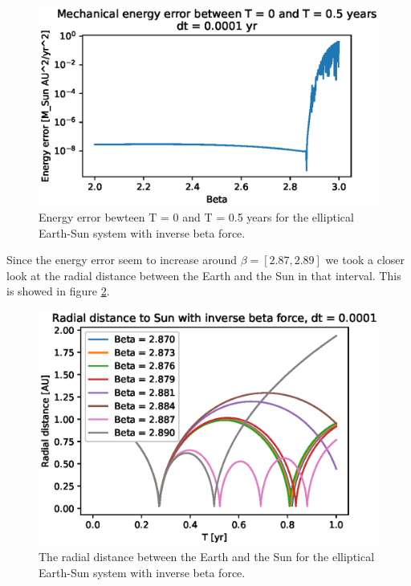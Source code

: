 \documentclass[american,a4paper,12pt]{article}
\begin{document}
\begin{figure}[H]
    \centering
    \includegraphics[width = \textwidth]{figures/EarthSun_InverseBeta_energy.eps}
    \caption{Energy error bewteen T = 0 and T = 0.5 years  for the elliptical Earth-Sun system with inverse beta force.}
    \label{fig:IB_energy}
\end{figure}
Since the energy error seem to increase around $\beta = [2.87, 2.89]$ we took a closer look at the radial distance between the Earth and the Sun in that interval. This is showed in figure \ref{fig:IB_radial}.

\begin{figure}[H]
    \centering
    \includegraphics[width = \textwidth]{figures/EarthSun_InverseBeta_radial.eps}
    \caption{The radial distance between the Earth and the Sun for the elliptical Earth-Sun system with inverse beta force.}
    \label{fig:IB_radial}
\end{figure}
\end{document}
